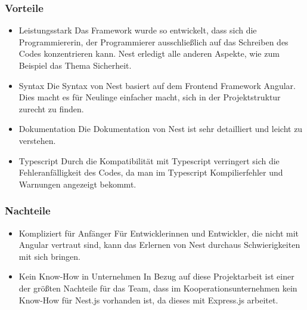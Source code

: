 \subsubsection{Vorteile}
\begin{itemize}
    \item Leistungsstark
    \newline
    Das Framework wurde so entwickelt, dass sich die Programmiererin, der Programmierer ausschließlich auf das Schreiben des Codes konzentrieren kann. Nest erledigt alle anderen Aspekte, wie zum Beispiel das Thema Sicherheit.
    \item Syntax
    \newline
    Die Syntax von Nest basiert auf dem Frontend Framework Angular. Dies macht es für Neulinge einfacher macht, sich in der Projektstruktur zurecht zu finden.
    \item Dokumentation
    \newline
    Die Dokumentation von Nest ist sehr detailliert und leicht zu verstehen.
    \item Typescript
    \newline
    Durch die Kompatibilität mit Typescript verringert sich die Fehleranfälligkeit des Codes, da man im Typescript Kompilierfehler und Warnungen angezeigt bekommt.
\end{itemize}

\subsubsection{Nachteile}
\begin{itemize}
    \item Kompliziert für Anfänger
    \newline
    Für Entwicklerinnen und Entwickler, die nicht mit Angular vertraut sind, kann das Erlernen von Nest durchaus Schwierigkeiten mit sich bringen.
    \item Kein Know-How in Unternehmen
    \newline
    In Bezug auf diese Projektarbeit ist einer der größten Nachteile für das Team, dass im Kooperationsunternehmen kein Know-How für Nest.js vorhanden ist, da dieses mit Express.js arbeitet.
\end{itemize}
\cite{Nest_js_Pros_Cons}
